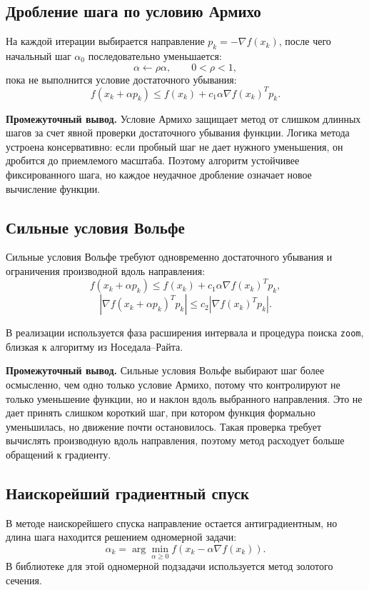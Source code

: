 \documentclass[14pt,a4paper]{extarticle}
\begin{document}
\subsection{Дробление шага по условию Армихо}

На каждой итерации выбирается направление $p_k=-\nabla f(x_k)$, после чего начальный шаг $\alpha_0$ последовательно уменьшается:
\[
    \alpha \leftarrow \rho\alpha, \qquad 0<\rho<1,
\]
пока не выполнится условие достаточного убывания:
\[
    f(x_k+\alpha p_k)\le f(x_k)+c_1\alpha\nabla f(x_k)^Tp_k.
\]

\textbf{Промежуточный вывод.} Условие Армихо защищает метод от слишком длинных шагов за счет явной проверки достаточного убывания функции. Логика метода устроена консервативно: если пробный шаг не дает нужного уменьшения, он дробится до приемлемого масштаба. Поэтому алгоритм устойчивее фиксированного шага, но каждое неудачное дробление означает новое вычисление функции.

\subsection{Сильные условия Вольфе}

Сильные условия Вольфе требуют одновременно достаточного убывания и ограничения производной вдоль направления:
\[
    f(x_k+\alpha p_k)\le f(x_k)+c_1\alpha\nabla f(x_k)^Tp_k,
\]
\[
    |\nabla f(x_k+\alpha p_k)^Tp_k|\le c_2|\nabla f(x_k)^Tp_k|.
\]

В реализации используется фаза расширения интервала и процедура поиска \texttt{zoom}, близкая к алгоритму из Носедала--Райта.

\textbf{Промежуточный вывод.} Сильные условия Вольфе выбирают шаг более осмысленно, чем одно только условие Армихо, потому что контролируют не только уменьшение функции, но и наклон вдоль выбранного направления. Это не дает принять слишком короткий шаг, при котором функция формально уменьшилась, но движение почти остановилось. Такая проверка требует вычислять производную вдоль направления, поэтому метод расходует больше обращений к градиенту.

\subsection{Наискорейший градиентный спуск}

В методе наискорейшего спуска направление остается антиградиентным, но длина шага находится решением одномерной задачи:
\[
    \alpha_k=\arg\min_{\alpha\ge0} f(x_k-\alpha\nabla f(x_k)).
\]
В библиотеке для этой одномерной подзадачи используется метод золотого сечения.
\end{document}
